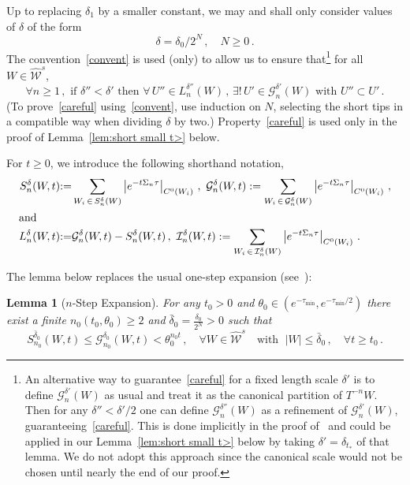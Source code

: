 \documentclass[10pt]{amsart}
\newtheorem{lemm}[theo]{Lemma}\newtheorem{prop}[theo]{Proposition}\newtheorem{coro}[theo]{Corollary}\newtheorem{conj}[theo]{Conjecture}
\theoremstyle{definition}\newtheorem{defi}[theo]{Definition}\newtheorem{rema}[theo]{Remark}\newtheorem{exam}[theo]{Example}\newtheorem{exem}[theo]{Example}\newtheorem{nota}[theo]{Notation}
\newcommand{\cG}{\mathcal{G}}
\newcommand{\cI}{\mathcal{I}}
\newcommand{\cW}{\mathcal{W}}
\newcommand{\hW}{\widehat{\cW}}
\let\oldexists\exists
\renewcommand*{\exists}{\mathrel{\oldexists}}
\let\oldforall\forall
\renewcommand*{\forall}{\mathrel{\oldforall}}
\begin{document}
Up to replacing $\delta_1$ by a smaller constant, we may and shall only consider values of $\delta$ of the form
\begin{equation}\label{convent}
\delta=\delta_0/2^N\,, \quad N\ge 0\,.
\end{equation}
The convention~\eqref{convent} is used (only) to allow us to ensure that\footnote{ An alternative way to guarantee~\eqref{careful} for a fixed length scale $\delta'$ is to define $\cG_n^{\delta'}(W)$ as usual and treat it as the canonical partition of $T^{-n}W$. Then for any $\delta'' < \delta'/2$ one can define $\cG_n^{\delta''}(W)$ as a refinement of $\cG_n^{\delta'}(W)$, guaranteeing~\eqref{careful}. This is done implicitly in the proof of~\cite[Lemma~3.11]{BD2} and could be applied in our Lemma~\ref{lem:short small t>} below by taking $\delta' = \delta_{t_*}$ of that lemma. We do not adopt this approach since the canonical scale would not be chosen until nearly the end of our proof.} for all $W\in \hW^s$,
\begin{equation}\label{careful}
\forall n\ge 1\,, \text{ if } \delta'' <\delta'
\text{ then } \forall \, U'' \in L^{\delta''}_n(W) \,, \, \exists! \, U'\in \cG^{\delta'}_n(W) \text{ with } U''\subset U'\,.
\end{equation}
(To prove~\eqref{careful} using~\eqref{convent}, use induction on $N$, selecting the short tips in a compatible way when dividing $\delta$ by two.) Property~\eqref{careful} is used only in the proof of Lemma~\ref{lem:short small t>} below.


For $t\ge 0$, we introduce the following shorthand notation,
\begin{align*}
S_{n}^{ \delta}(W,t) &{:=}
\sum_{W_i\,\in\,S_{n}^{ \delta}(W)} \left|e^{-t \Sigma_{n} \tau}\right|_{C^0(W_i)}
\,,\,\,
\cG_{n}^{ \delta}(W,t):=
\sum_{W_i\,\in\,\cG_{n}^{ \delta}(W)} \left|e^{-t\Sigma_{n} \tau }\right|_{C^0(W_i)}\,,
\\
\intertext{and}
L_{n}^{ \delta}(W,t) &{:=}\cG_{n}^{ \delta}(W,t)-S_{n}^{ \delta}(W,t)\,, \, \, \cI^{\delta}_n(W,t) :=\sum_{W_i\,\in \,\cI_{n}^{ \delta}(W)} \left|e^{-t\Sigma_{n} \tau }\right|_{C^0(W_i)}\,.
\end{align*}

The lemma below replaces the usual one-step expansion (see~\cite[Lemma~3.1]{BD2}):

\begin{lemm}[{$n$-Step Expansion}]\label{lem:N step}
For any $t_0>0$ and $\theta_0 \in (e^{- \tau_{\min}},e^{- \tau_{\min}/2})$ there exist a finite $n_0(t_0, \theta_0) \ge 2$ and $ \bar \delta_0=\frac{\delta_0}{2^N}>0$ such that
\begin{equation}\label{eq:theta}
S_{n_0}^{\bar\delta_0}(W,t) \le \cG_{n_0}^{\delta_0}(W,t) < \theta_0^{n_0 t}\,,\quad\forall W \in \hW^s
\quad\text{with }\; |W|\le \bar \delta_0 \,,\quad
\forall t\ge t_0 \,.
\end{equation}
\end{lemm}
\end{document}
